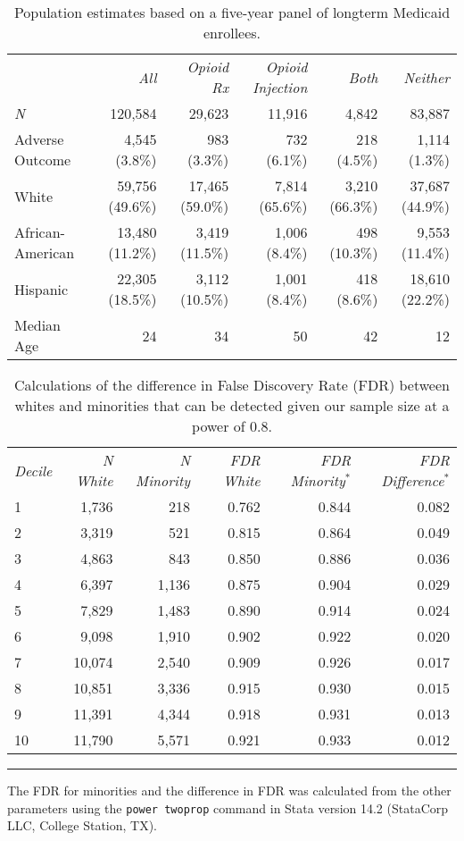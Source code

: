 \documentclass[9pt,twoside]{pnas-new}
\begin{document}
\begin{table}
\caption{Population estimates based on a five-year panel of longterm Medicaid enrollees.}
\centering
\begin{tabular}{lrrrrr}
 & \em All & \em Opioid Rx & \em Opioid Injection & \em Both & \em Neither \\[0.5em]
\em N & 120,584 & 29,623 & 11,916 & 4,842 & 83,887 \\
Adverse Outcome & 4,545 (3.8\%) & 983 (3.3\%) & 732 (6.1\%) & 218 (4.5\%) & 1,114 (1.3\%) \\
White & 59,756 (49.6\%) & 17,465 (59.0\%) & 7,814 (65.6\%) & 3,210 (66.3\%) & 37,687 (44.9\%) \\
African-American & 13,480 (11.2\%) & 3,419 (11.5\%) & 1,006 (8.4\%) & 498 (10.3\%) & 9,553 (11.4\%) \\
Hispanic & 22,305 (18.5\%) & 3,112 (10.5\%) & 1,001 (8.4\%) & 418 (8.6\%) & 18,610 (22.2\%) \\
Median Age & 24 & 34 & 50 & 42 & 12
\end{tabular}
\end{table}

\begin{table}
\caption{Calculations of the difference in False Discovery Rate (FDR) between whites and minorities that can be detected given our sample size at a power of 0.8.}
\centering
\begin{tabular}{lrrrrr}
\em Decile & \em N White & \em N Minority & \em FDR White & \em FDR Minority$^*$ & \em FDR Difference$^*$ \\[0.5em]
1 & 1,736 & 218 & 0.762 & 0.844 & 0.082 \\
2 & 3,319 & 521 & 0.815 & 0.864 & 0.049 \\
3 & 4,863 & 843 & 0.850 & 0.886 & 0.036 \\
4 & 6,397 & 1,136 & 0.875 & 0.904 & 0.029 \\
5 & 7,829 & 1,483 & 0.890 & 0.914 & 0.024 \\
6 & 9,098 & 1,910 & 0.902 & 0.922 & 0.020 \\
7 & 10,074 & 2,540 & 0.909 & 0.926 & 0.017 \\
8 & 10,851 & 3,336 & 0.915 & 0.930 & 0.015 \\
9 & 11,391 & 4,344 & 0.918 & 0.931 & 0.013 \\
10 & 11,790 & 5,571 & 0.921 & 0.933 & 0.012 \\[1em]
\end{tabular}
\hrule
\begin{tablenotes}
\footnotesize
\item * The FDR for minorities and the difference in FDR was calculated from the other parameters using the \texttt{power twoprop} command in Stata version 14.2 (StataCorp LLC, College Station, TX).
\end{tablenotes}
\end{table}
\end{document}
